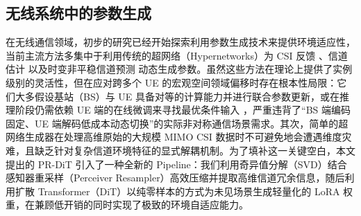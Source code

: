 \documentclass[12pt,a4paper]{article}
\begin{document}
\subsection{无线系统中的参数生成}
在无线通信领域，初步的研究已经开始探索利用参数生成技术来提供环境适应性，当前主流方法多集中于利用传统的超网络（Hypernetworks）为 CSI 反馈 \cite{sun2022hypercsi, hrnet2024}、信道估计 \cite{liu2021deep, liu2025hypernetwork} 以及时变非平稳信道预测 \cite{hyperchannel2024, hyper_ce_2025} 动态生成参数。虽然这些方法在理论上提供了实例级别的灵活性，但在应对跨多个 UE 的宏观空间领域偏移时存在根本性局限：它们大多假设基站（BS）与 UE 具备对等的计算能力并进行联合参数更新，或在推理阶段仍需依赖 UE 端的在线微调来寻找最优条件输入 \cite{liu2025hypernetwork}，严重违背了“BS 端编码固定、UE 端解码低成本动态切换”的实际非对称通信场景需求。其次，简单的超网络生成器在处理高维原始的大规模 MIMO CSI 数据时不可避免地会遭遇维度灾难，且缺乏针对复杂信道环境特征的显式解耦机制。为了填补这一关键空白，本文提出的 PR-DiT 引入了一种全新的 Pipeline：我们利用奇异值分解（SVD）结合感知器重采样（Perceiver Resampler）高效压缩并提取高维信道冗余信息，随后利用扩散 Transformer（DiT）以纯零样本的方式为未见场景生成轻量化的 LoRA 权重，在兼顾低开销的同时实现了极致的环境自适应能力。







\end{document}
